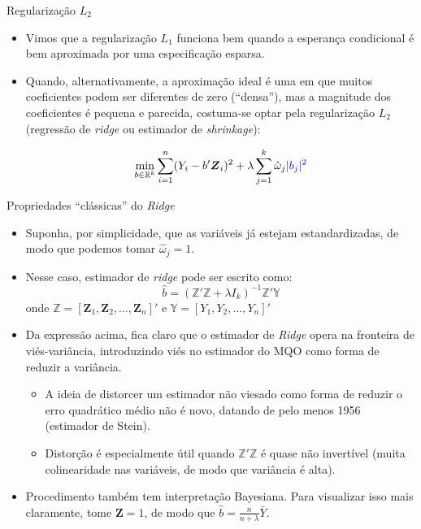 \documentclass[11pt]{beamer}
\begin{document}
\begin{frame}{Regularização $L_2$}
\begin{itemize}
	\item Vimos que a regularização $L_1$ funciona bem quando a esperança condicional é bem aproximada por uma especificação esparsa.
	\item Quando, alternativamente, a aproximação ideal é uma em que muitos coeficientes podem ser diferentes de zero (``densa''), mas a magnitude dos coeficientes é pequena e parecida, costuma-se optar pela regularização $L_2$ ({\color{blue}regressão de \textit{ridge} ou estimador de \textit{shrinkage}}):
	
		$$\min_{b \in \mathbb{R}^k}\sum_{i=1}^n (Y_i-b'\boldsymbol{Z}_i)^2 + \lambda \sum_{j=1}^k \hat \omega_j {\color{blue}|b_j|^2}$$
\end{itemize}
\end{frame}

\begin{frame}{Propriedades ``clássicas'' do  \textit{Ridge}}
	\begin{itemize}
		\item Suponha, por simplicidade, que as variáveis já estejam estandardizadas, de modo que podemos tomar $\hat{\omega}_j = 1$.
		\item Nesse caso, estimador de \textit{ridge} pode ser escrito como:
		$$\hat{b}=(\mathbb{Z}'\mathbb{Z} + \lambda I_{k})^{-1} \mathbb{Z}'\mathbb{Y}$$
		onde $\mathbb{Z} = [\boldsymbol{Z}_1, \boldsymbol{Z}_2, \ldots, \boldsymbol{Z}_n]'$ e $\mathbb{Y} = [Y_1,Y_2,\ldots, Y_n]'$
		\item Da expressão acima, fica claro que o estimador de \textit{Ridge} opera na fronteira de viés-variância, introduzindo viés no estimador do MQO como forma de reduzir a variância.
		\begin{itemize}
			\item A ideia de distorcer um estimador não viesado como forma de reduzir o erro quadrático médio não é novo, datando de pelo menos 1956 (estimador de Stein).
			\item Distorção é especialmente útil quando $\mathbb{Z}'\mathbb{Z}$ é quase não invertível (muita colinearidade nas variáveis, de modo que variância é alta).
		\end{itemize}
		\item Procedimento também tem interpretação Bayesiana. Para visualizar isso mais claramente, tome $\boldsymbol{Z} = 1$, de modo que $\hat{b} = \frac{n}{n+\lambda} \bar{Y} $.
	\end{itemize}
\end{frame}
\end{document}
